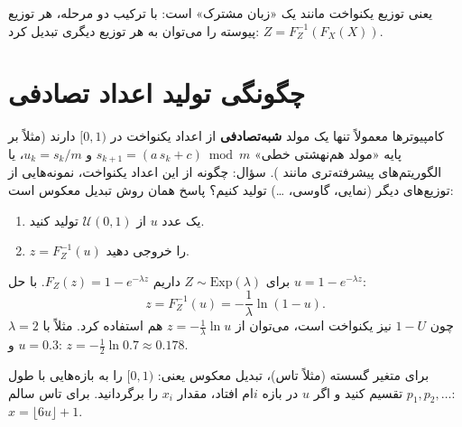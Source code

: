 \begin{center}
\end{center}
یعنی توزیع یکنواخت مانند یک «زبان مشترک» است: با ترکیب دو مرحله، هر توزیع پیوسته را می‌توان به هر توزیع دیگری تبدیل کرد: $Z=F_Z^{-1}(F_X(X))$.

\section{چگونگی تولید اعداد تصادفی}

کامپیوترها معمولاً تنها یک مولد \textbf{شبه‌تصادفی} از اعداد یکنواخت در $[0,1)$ دارند (مثلاً بر پایه «مولد هم‌نهشتی خطی» $s_{k+1}=(a\,s_k+c)\bmod m$ و $u_k=s_k/m$، یا الگوریتم‌های پیشرفته‌تری مانند ). سؤال: چگونه از این اعداد یکنواخت، نمونه‌هایی از توزیع‌های دیگر (نمایی، گاوسی، \ldots) تولید کنیم؟ پاسخ همان روش تبدیل معکوس است:

\begin{summarybox}
\begin{enumerate}
\item یک عدد $u$ از $\mathcal U(0,1)$ تولید کنید.
\item $z=F_Z^{-1}(u)$ را خروجی دهید.
\end{enumerate}
\end{summarybox}

\begin{example}
برای $Z\sim\mathrm{Exp}(\lambda)$ داریم $F_Z(z)=1-e^{-\lambda z}$. با حل $u=1-e^{-\lambda z}$:
\[
z=F_Z^{-1}(u)=-\frac{1}{\lambda}\ln(1-u).
\]
چون $1-U$ نیز یکنواخت است، می‌توان از $z=-\frac1\lambda\ln u$ هم استفاده کرد. مثلاً با $\lambda=2$ و $u=0.3$: $z=-\frac12\ln0.7\approx0.178$.
\end{example}

\begin{example}
برای متغیر گسسته (مثلاً تاس)، تبدیل معکوس یعنی: $[0,1)$ را به بازه‌هایی با طول $p_1,p_2,\ldots$ تقسیم کنید و اگر $u$ در بازه $i$ام افتاد، مقدار $x_i$ را برگردانید. برای تاس سالم: $x=\lfloor6u\rfloor+1$.
\end{example}

